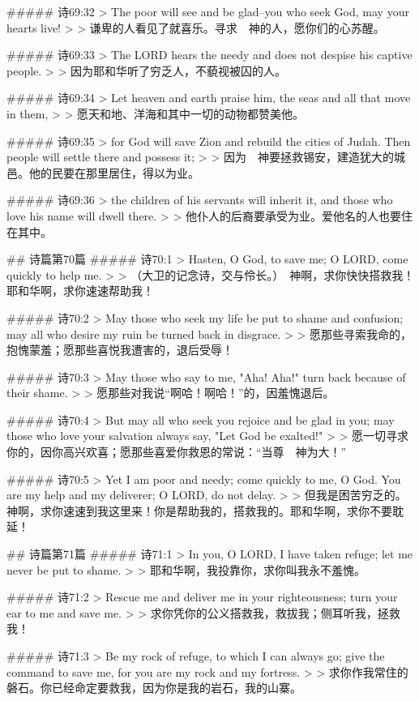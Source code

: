 ##### 诗69:32
> The poor will see and be glad--you who seek God, may your hearts live!
>
> 谦卑的人看见了就喜乐。寻求　神的人，愿你们的心苏醒。


##### 诗69:33
> The LORD hears the needy and does not despise his captive people.
>
> 因为耶和华听了穷乏人，不藐视被囚的人。


##### 诗69:34
> Let heaven and earth praise him, the seas and all that move in them,
>
> 愿天和地、洋海和其中一切的动物都赞美他。


##### 诗69:35
> for God will save Zion and rebuild the cities of Judah. Then people will settle there and possess it;
>
> 因为　神要拯救锡安，建造犹大的城邑。他的民要在那里居住，得以为业。


##### 诗69:36
> the children of his servants will inherit it, and those who love his name will dwell there.
>
> 他仆人的后裔要承受为业。爱他名的人也要住在其中。


## 诗篇第70篇
##### 诗70:1
> Hasten, O God, to save me; O LORD, come quickly to help me.
>
> （大卫的记念诗，交与伶长。）　神啊，求你快快搭救我！耶和华啊，求你速速帮助我！


##### 诗70:2
> May those who seek my life be put to shame and confusion; may all who desire my ruin be turned back in disgrace.
>
> 愿那些寻索我命的，抱愧蒙羞；愿那些喜悦我遭害的，退后受辱！


##### 诗70:3
> May those who say to me, "Aha! Aha!" turn back because of their shame.
>
> 愿那些对我说“啊哈！啊哈！”的，因羞愧退后。


##### 诗70:4
> But may all who seek you rejoice and be glad in you; may those who love your salvation always say, "Let God be exalted!"
>
> 愿一切寻求你的，因你高兴欢喜；愿那些喜爱你救恩的常说：“当尊　神为大！”


##### 诗70:5
> Yet I am poor and needy; come quickly to me, O God. You are my help and my deliverer; O LORD, do not delay.
>
> 但我是困苦穷乏的。　神啊，求你速速到我这里来！你是帮助我的，搭救我的。耶和华啊，求你不要耽延！


## 诗篇第71篇
##### 诗71:1
> In you, O LORD, I have taken refuge; let me never be put to shame.
>
> 耶和华啊，我投靠你，求你叫我永不羞愧。


##### 诗71:2
> Rescue me and deliver me in your righteousness; turn your ear to me and save me.
>
> 求你凭你的公义搭救我，救拔我；侧耳听我，拯救我！


##### 诗71:3
> Be my rock of refuge, to which I can always go; give the command to save me, for you are my rock and my fortress.
>
> 求你作我常住的磐石。你已经命定要救我，因为你是我的岩石，我的山寨。


